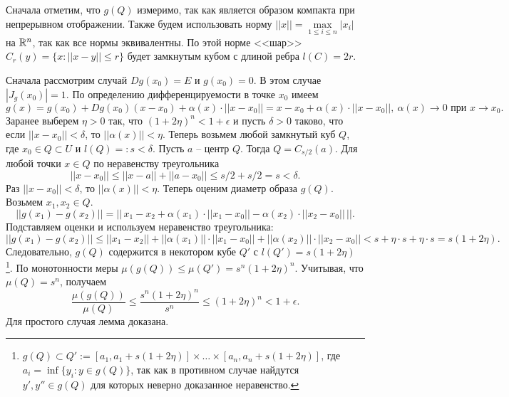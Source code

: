 \begin{myproof}
    Сначала отметим, что $g(Q)$ измеримо, так как является образом компакта при непрерывном отображении. 
    Также будем использовать норму $||x|| = \max \limits_{1 \leq i \leq n} |x_i|$ на $\mathbb{R}^n$, так как все нормы эквивалентны. 
    По этой норме <<шар>> $C_r(y) = \{x : ||x - y|| \leq r\}$ будет замкнутым кубом с длиной ребра $l(C) = 2r$.

    \vspace{5pt}
    Сначала рассмотрим случай $Dg(x_0) = E$ и $g(x_0) = 0$.
	В этом случае $|J_g(x_0)| = 1$.
    По определению дифференцируемости в точке $x_0$ имеем 
	\[ g(x) = g(x_0) + Dg(x_0)(x-x_0) + \alpha(x) \cdot ||x - x_0|| = x-x_0 + \alpha(x) \cdot ||x-x_0||, \ \alpha(x) \to 0 \text{ при } x \to x_0. \]
    Заранее выберем $\eta > 0$ так, что $(1+2\eta)^n < 1 + \epsilon$ и пусть $\delta > 0$ таково, что если $||x - x_0|| < \delta$, то $||\alpha(x)|| < \eta$.
    Теперь возьмем любой замкнутый куб $Q$, где $x_0 \in Q \subset U$ и $l(Q) =: s < \delta$. 
    Пусть $a$ -- центр $Q$. Тогда $Q = C_{s/2} (a)$. 
    Для любой точки $x \in Q$ по неравенству треугольника 
	\[ ||x - x_0|| \leq ||x - a|| + ||a - x_0|| \leq s/2 + s/2 = s < \delta. \]
	Раз $||x - x_0|| < \delta$, то $||\alpha(x)|| < \eta$. 
	Теперь оценим диаметр образа $g(Q)$. Возьмем $x_1, x_2 \in Q$.
	\[ || g(x_1) - g(x_2) || = || \, x_1 - x_2 + \alpha(x_1) \cdot ||x_1-x_0|| - \alpha(x_2) \cdot ||x_2-x_0|| \, ||. \]
	Подставляем оценки и используем неравенство треугольника: 
	\[ || g(x_1) - g(x_2) || \leq ||x_1 - x_2|| + ||\alpha(x_1)|| \cdot ||x_1-x_0|| + ||\alpha(x_2)|| \cdot ||x_2-x_0|| < s + \eta \cdot s + \eta \cdot s = s(1+2\eta).\]
	Следовательно, $g(Q)$ содержится в некотором кубе $Q'$ с $l(Q') = s(1 + 2\eta)$ \footnote{$g(Q) \subset Q' := [a_1, a_1 + s(1 + 2\eta)] \times \dotsc \times [a_n, a_n + s(1 + 2\eta)]$, где $a_i = \inf \{y_i : y \in g(Q)\}$, так как в противном случае найдутся $y', y'' \in g(Q)$ для которых неверно доказанное неравенство.}. 
	По монотонности меры $\mu(g(Q)) \leq \mu(Q') = s^n (1+2\eta)^n$. 
    Учитывая, что $\mu(Q) = s^n$, получаем
    \[ \frac{\mu(g(Q))}{\mu(Q)} \leq \frac{s^n(1+2\eta)^n}{s^n} \leq (1+2\eta)^n < 1 + \epsilon. \]
	Для простого случая лемма доказана.


\end{myproof}
